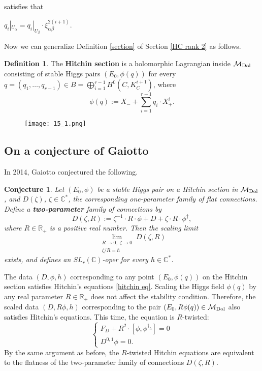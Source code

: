 \documentclass[oneside, 11pt]{amsart}
\newtheorem{conj}[thm]{Conjecture}
\theoremstyle{definition}
\newtheorem{Def}[thm]{Definition}
\numberwithin{equation}{subsection}
\def\Dol{{\text{\rm{Dol}}}}
\newcommand{\be}{\begin{equation}}
\newcommand{\ee}{\end{equation}}
\newcommand{\bC}{{\mathbb{C}}}
\newcommand{\bR}{{\mathbb{R}}}
\newcommand{\cM}{{\mathcal{M}}}
\newcommand{\rar}{\rightarrow}
\begin{document}
satisfies that  {$q_i|_{U_{\alpha}}=q_i|_{U_{\beta}}\cdot \xi_{\alpha \beta}^{2(i+1)}$. 


Now we can generalize Definition \ref{section} of Section \ref{HC rank 2} as follows.

\begin{Def}
The \textbf{Hitchin section} is a 
holomorphic Lagrangian inside $\mathcal{M}_{\Dol}$
consisting of stable Higgs pairs 
$\left(E_0,\phi(q)\right)$ for every 
 $q=(q_1,\ldots, q_{r-1}) \in B = 
 \bigoplus_{i=1}^{r-1}H^0\!\left(C, K_C^{i+1}\right)
 $, where
 $$\phi(q):=X_{-}+\sum_{i=1}^{r-1}q_i \cdot X_{+}^i.$$
\end{Def}


\begin{figure}[htb]
\texttt{[image: 15\_1.png]}
\end{figure}


\subsection{On a conjecture of Gaiotto}\label{section 6}

In 2014, Gaiotto \cite{G} conjectured the 
following.
\begin{conj}\label{dgaiotto}
Let $(E_0,\phi)$ be a stable Higgs pair 
on a Hitchin section
in $\cM_{\Dol}$,
and $D(\zeta)$, $\zeta\in \bC^*$, the corresponding
one-parameter family of flat connections. Define 
a \textbf{two-parameter} family of connections
by 
\be
\label{two}
D(\zeta, R) := \zeta^{-1} \cdot R \cdot \phi + D + \zeta \cdot R \cdot \phi^{\dagger},
\ee
where $R\in \bR_+$ is a positive real number. 
Then the scaling limit
$$
\lim_{\substack{R\rar 0,\;\zeta\rar 0\\
\zeta/R = \hbar}} D(\zeta,R)
$$
exists, and defines an $SL_r(\bC)$-oper for
every $\hbar\in \bC^*$. 
\end{conj}

The data $(D,\phi,h)$
corresponding to any point $(E_{0}, \phi(q))$
on the Hitchin section  satisfies Hitchin's equations \eqref{hitchin eq}. Scaling the Higgs field
 $\phi(q)$ by any real parameter $R\in \mathbb{R}_{+}$ does not affect the 
 stability condition. 
 Therefore, the scaled 
 data $(D,R\phi,h)$ corresponding
 to the pair  
 $(E_{0}, R\phi(q))\in \mathcal{M}_{\Dol}$ 
 also satisfies  Hitchin's equations. This time,
 the equation is $R$-twisted:
 \be\label{R twisted}
\begin{cases}
F_D + R^2 \cdot [\phi, \phi^{\dagger_h}] = 0\\
D^{0,1} \phi= 0.
\end{cases}
\ee
By the same argument as before,
the $R$-twisted Hitchin equations are
equivalent to the flatness of the two-parameter
family of connections $D(\zeta,R)$. 

}
\end{document}
